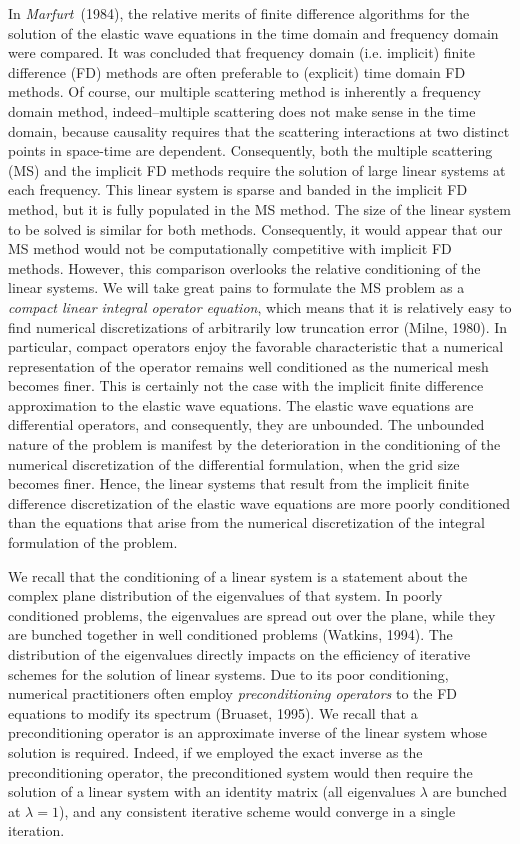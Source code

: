 In {\em Marfurt\/}~(1984), the relative merits of finite difference 
algorithms for the solution of  the elastic 
wave equations in the time domain and frequency domain were compared. 
It was concluded that frequency domain (i.e. implicit) finite difference 
(FD) methods are often preferable to 
(explicit) time domain FD methods. Of course, our multiple scattering method is 
inherently a frequency domain method, indeed--multiple scattering does 
not make sense in the time domain, because causality requires that 
the scattering interactions at two distinct points in space-time are  dependent. 
Consequently, both the multiple scattering (MS) and the 
implicit FD methods require the solution of large linear 
systems at each frequency. This linear system is sparse and banded in the 
implicit FD method, but it is fully populated in the MS method. The size 
of the linear system to be solved is similar for both methods. 
Consequently, it would appear that our MS method would not be 
computationally competitive with implicit FD methods. However, this 
comparison overlooks the relative conditioning of the linear systems. We 
will take great pains to formulate the MS problem as a {\em compact linear 
integral operator equation\/}, which means that it is relatively easy to find 
numerical discretizations of arbitrarily low truncation error (Milne, 
1980). In particular, compact operators enjoy the favorable 
characteristic that a numerical representation of the operator remains 
well conditioned as the numerical mesh becomes finer. This is certainly 
not the case with the implicit finite difference approximation to the 
elastic wave equations. The elastic wave equations are differential 
operators, and consequently, they are unbounded. The unbounded nature of 
the problem is manifest by the deterioration in the conditioning of the 
numerical discretization of the differential formulation, when 
the grid size becomes finer. Hence, the linear systems that result 
from the implicit finite difference discretization of the elastic wave 
equations are more poorly conditioned than the equations that arise from 
the numerical discretization of the integral formulation of the problem.

We recall that the conditioning of a linear system is a statement about 
the complex plane distribution of the eigenvalues of that system. In 
poorly conditioned problems, the eigenvalues are spread out over the plane,
while they are bunched together in well conditioned problems (Watkins, 
1994). The distribution of the eigenvalues directly impacts on the 
efficiency of iterative schemes for the solution of linear systems. Due 
to its poor conditioning, numerical practitioners often employ {\em 
preconditioning operators\/} to the FD equations to modify its spectrum 
(Bruaset, 1995). We recall that a preconditioning operator is an 
approximate inverse of the linear system whose solution is required. 
Indeed, if we employed the exact inverse as the preconditioning operator, 
the preconditioned system would then require the solution of a linear system
with an identity matrix (all eigenvalues $\lambda$ are bunched at 
$\lambda=1$), and any consistent iterative scheme would converge in a 
single iteration. 

